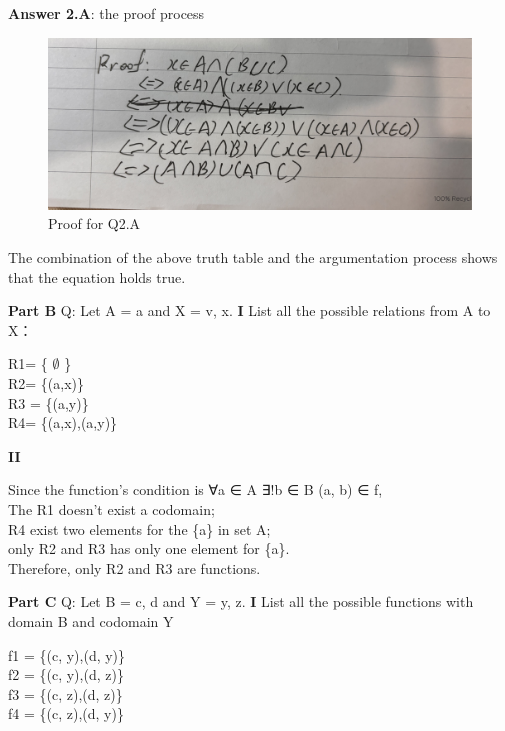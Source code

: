 \documentclass{article}
\begin{document}
		\par
		\noindent
		\textbf{Answer 2.A}: the proof process
		
		\begin{figure}[H]
			\centering
			\includegraphics[width=0.75\linewidth]{2.A.PROOF.jpg}
			\caption{Proof for Q2.A}
		\end{figure}
		The combination of the above truth table and the argumentation process shows that the equation holds true.
		\par
		
		\newpage
		
	\textbf{Part B}
		\noindent	
		Q: Let A = {a} and X = {v, x}.
			\textbf{I}
			List all the possible relations from A to X：\\
			
			\begin{center}
				R1= \{ $\emptyset$ \}\\ 
				R2= \{(a,x)\}\\
				R3 = \{(a,y)\}\\
				R4= \{(a,x),(a,y)\}\\ 
			\end{center}
			\textbf{II}
			
			\par
			\noindent	
			Since the function's condition is ∀a ∈ A ∃!b ∈ B (a, b) ∈ f,\\
			The R1 doesn't exist a codomain;\\
			R4 exist two elements for the \{a\} in set A;\\
			only R2 and R3 has only one element for \{a\}.\\
			Therefore, only R2 and R3 are functions.\\
			\par
			
	\textbf{Part C}
		\noindent	
		Q: Let B = {c, d} and Y = {y, z}.
		\textbf{I}
		List all the possible functions with domain B and codomain Y \\
		
		\begin{center}
			f1 = \{(c, y),(d, y)\} \\
			f2 = \{(c, y),(d, z)\} \\
			f3 = \{(c, z),(d, z)\} \\
			f4 = \{(c, z),(d, y)\} \\
		\end{center}
		
\end{document}
